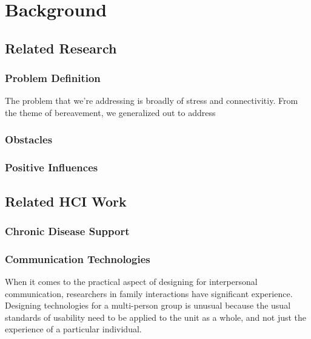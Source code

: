 \chapter{Background}
\section{Related Research}
  \subsection{Problem Definition}
  The problem that we're addressing is broadly of stress and connectivitiy.
  From the theme of bereavement, we generalized out to address


  \subsection{Obstacles}

  \subsection{Positive Influences}

\section{Related HCI Work}
  \subsection{Chronic Disease Support}


  \subsection{Communication Technologies}
    When it comes to the practical aspect of designing for interpersonal
    communication, researchers in family interactions have significant experience.
    Designing technologies for a multi-person group is unusual because the usual
    standards of usability need to be applied to the unit as a whole, and not just
    the experience of a particular individual. \cite{neustaedter12}

